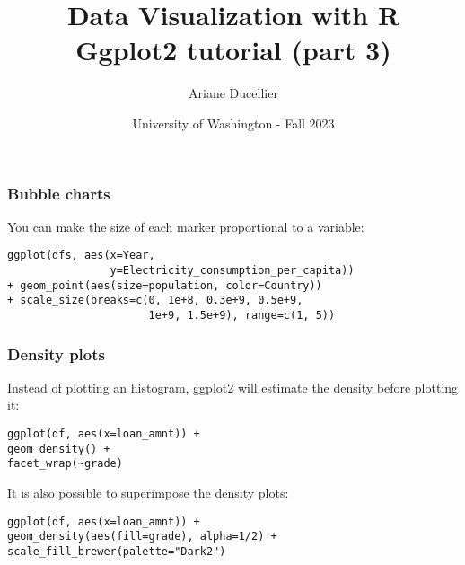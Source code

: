 \documentclass{beamer}
\title[Data Visualization with R - Ggplot2 tutorial (part 3)]{Data Visualization with R \\ Ggplot2 tutorial (part 3)}
\author{Ariane Ducellier}
\date{University of Washington - Fall 2023}
\begin{document}
	\begin{frame}
		\titlepage
	\end{frame}

	\begin{frame}[fragile]
		\frametitle{Bubble charts}

		You can make the size of each marker proportional to a variable:

		\vspace{2em}

		\begin{exampleblock}{}
		\begin{BVerbatim}
ggplot(dfs, aes(x=Year,
                y=Electricity_consumption_per_capita))
+ geom_point(aes(size=population, color=Country))
+ scale_size(breaks=c(0, 1e+8, 0.3e+9, 0.5e+9,
                      1e+9, 1.5e+9), range=c(1, 5))
		\end{BVerbatim}
		\end{exampleblock}{}

	\end{frame}

	\begin{frame}[fragile]
		\frametitle{Density plots}

		Instead of plotting an histogram, ggplot2 will estimate the density before plotting it:

		\vspace{1em}

		\begin{exampleblock}{}
		\begin{BVerbatim}
ggplot(df, aes(x=loan_amnt)) + 
geom_density() + 
facet_wrap(~grade)
		\end{BVerbatim}
		\end{exampleblock}{}

		\vspace{1em}

		It is also possible to superimpose the density plots:

		\vspace{1em}
	
		\begin{exampleblock}{}
		\begin{BVerbatim}
ggplot(df, aes(x=loan_amnt)) + 
geom_density(aes(fill=grade), alpha=1/2) +
scale_fill_brewer(palette="Dark2")
		\end{BVerbatim}
		\end{exampleblock}{}

	\end{frame}
\end{document}
